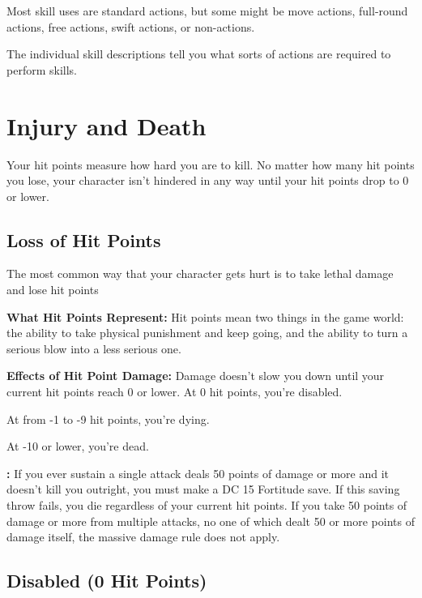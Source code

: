 Most skill uses are standard actions, but some might be move actions, full-round 
actions, free actions, swift actions, or non-actions.

The individual skill descriptions tell you what sorts of actions are required to 
perform skills.

\section{Injury and Death}

Your hit points measure how hard you are to kill. No matter how many hit points 
you lose, your character isn't hindered in any way until your hit points drop to 
0 or lower.

\subsection{Loss of Hit Points}

The most common way that your character gets hurt is to take lethal damage and 
lose hit points

\textbf{What Hit Points Represent:} Hit points mean two things in the game world: 
the ability to take physical punishment and keep going, and the ability to turn 
a serious blow into a less serious one.

\textbf{Effects of Hit Point Damage:} Damage doesn't slow you down until your current 
hit points reach 0 or lower. At 0 hit points, you're disabled.

At from -1 to -9 hit points, you're dying.

At -10 or lower, you're dead.

\textbf{:} If you ever sustain a single attack deals 50 points of 
damage or more and it doesn't kill you outright, you must make a DC 15 Fortitude 
save. If this saving throw fails, you die regardless of your current hit points. 
If you take 50 points of damage or more from multiple attacks, no one of which 
dealt 50 or more points of damage itself, the massive damage rule does not apply.

\subsection{Disabled (0 Hit Points)}

